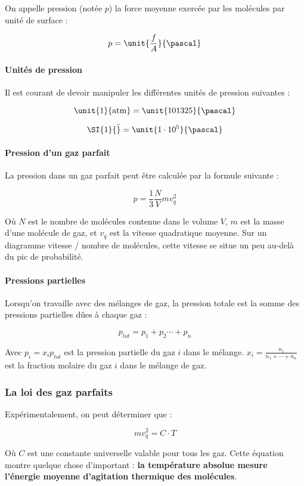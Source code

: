 On appelle pression (notée $p$) la force moyenne exercée par les 
molécules par unité de surface :
  
$$p = \unit{\frac{f}{A}}{\pascal}$$

\paragraph{Unités de pression}
Il est courant de devoir manipuler les différentes unités de pression
suivantes :

$$\unit{1}{\atm} = \unit{101325}{\pascal}$$

$$\SI{1}{\bar} = \unit{1 \cdot 10^5}{\pascal}$$


\paragraph{Pression d'un gaz parfait}
La pression dans un gaz parfait peut être calculée par la formule suivante :

$$p = \frac{1}{3} \frac{N}{V} mv^2_q$$

Où $N$ est le nombre de molécules contenue dans le volume $V$, $m$ est
la masse d'une molécule de gaz, et $v_q$ est la vitesse quadratique
moyenne. Sur un diagramme vitesse / nombre de molécules, cette vitesse
se situe un peu au-delà du pic de probabilité.


\paragraph{Pressions partielles}
Lorsqu'on travaille avec des mélanges de gaz, la pression totale est la somme
des pressions partielles dûes à chaque gaz :

$$p_{tot} = p_1 + p_2 \cdots + p_n$$

Avec $p_i = x_ip_{tot}$ est la pression partielle du gaz $i$ dans le mélange.
$x_i = \frac{n_i}{n_1 + \cdots + n_n}$ est la fraction molaire du gaz $i$
dans le mélange de gaz.

\subsubsection{La loi des gaz parfaits}
Expérimentalement, on peut déterminer que :

$$mv_q^2 = C \cdot T$$

Où $C$ est une constante universelle valable pour tous les gaz. Cette équation 
montre quelque chose d'important : \textbf{la température absolue mesure l'énergie
moyenne d'agitation thermique des molécules}.

